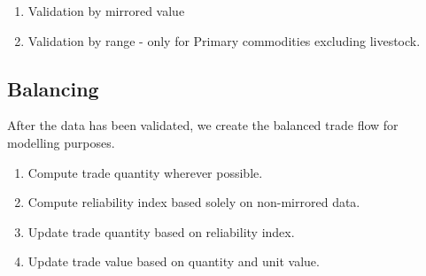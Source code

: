 \documentclass[nojss]{jss}
\begin{document}
\begin{enumerate}
  \item Validation by mirrored value
  \item Validation by range - only for Primary commodities excluding livestock.
\end{enumerate}


\subsection{Balancing}

After the data has been validated, we create the balanced trade flow
for modelling purposes.

\begin{enumerate}
  \item Compute trade quantity wherever possible.
  \item Compute reliability index based solely on non-mirrored data.
  \item Update trade quantity based on reliability index.
  \item Update trade value based on quantity and unit value.
\end{enumerate}




\end{document}
